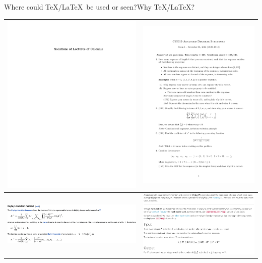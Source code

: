 \documentclass[mathserif]{beamer}
\begin{document}
\begin{frame}{Where could \TeX/\LaTeX\ be used or seen?}{Why \TeX/\LaTeX?}

\begin{tabular}{c|c}
\includegraphics[width=.45\linewidth,page=5,trim=1.5in 7.5in 1.5in 1.875in,clip]{Solution-of-Calculus} & \includegraphics[width=.45\linewidth,page=1,trim=.87in 2.5in 1.69in 7.875in,clip]{exam1-2022}\\\hline
\includegraphics[width=.45\linewidth,align=c]{linalg} & \includegraphics[width=.45\linewidth,align=c]{oj}
\end{tabular}

\end{frame}
\end{document}
